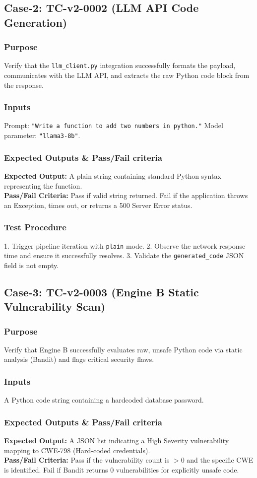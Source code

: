 \documentclass[12pt, a4paper]{article}
\begin{document}
\subsection{Case-2: TC-v2-0002 (LLM API Code Generation)}
\subsubsection{Purpose}
Verify that the \texttt{llm\_client.py} integration successfully formats the payload, communicates with the LLM API, and extracts the raw Python code block from the response.
\subsubsection{Inputs}
Prompt: \texttt{"Write a function to add two numbers in python."} Model parameter: \texttt{"llama3-8b"}.
\subsubsection{Expected Outputs \& Pass/Fail criteria}
\textbf{Expected Output:} A plain string containing standard Python syntax representing the function. \\
\textbf{Pass/Fail Criteria:} Pass if valid string returned. Fail if the application throws an Exception, times out, or returns a 500 Server Error status.
\subsubsection{Test Procedure}
1. Trigger pipeline iteration with \texttt{plain} mode. 2. Observe the network response time and ensure it successfully resolves. 3. Validate the \texttt{generated\_code} JSON field is not empty.

\subsection{Case-3: TC-v2-0003 (Engine B Static Vulnerability Scan)}
\subsubsection{Purpose}
Verify that Engine B successfully evaluates raw, unsafe Python code via static analysis (Bandit) and flags critical security flaws.
\subsubsection{Inputs}
A Python code string containing a hardcoded database password.
\subsubsection{Expected Outputs \& Pass/Fail criteria}
\textbf{Expected Output:} A JSON list indicating a High Severity vulnerability mapping to CWE-798 (Hard-coded credentials). \\
\textbf{Pass/Fail Criteria:} Pass if the vulnerability count is $> 0$ and the specific CWE is identified. Fail if Bandit returns 0 vulnerabilities for explicitly unsafe code.
\end{document}
